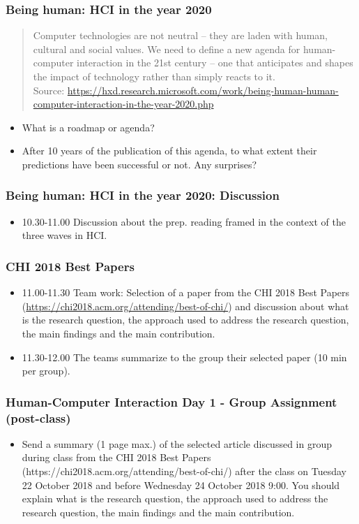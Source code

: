 \documentclass[screen, aspectratio=43]{beamer}
\begin{document}
%
\begin{frame}
\frametitle{Being human: HCI in the year 2020}
\begin{quote}Computer technologies are not neutral – they are laden with human, cultural and social values.  We need to define a new agenda for human-computer interaction in the 21st century – one that anticipates and shapes the impact of technology rather than simply reacts to it. \\
{\scriptsize Source: \url{https://hxd.research.microsoft.com/work/being-human-human-computer-interaction-in-the-year-2020.php} }
\end{quote}
\begin{itemize}
\item What is a roadmap or agenda?
\item After 10 years of the publication of this agenda, to what extent their predictions have been successful or not. Any surprises?
\end{itemize}
\end{frame}
%
\begin{frame}
\frametitle{Being human: HCI in the year 2020: Discussion}
\begin{itemize}
\item 10.30-11.00 Discussion about the prep. reading framed in the context of the three waves in HCI.
\end{itemize}
\end{frame}
%
\begin{frame}
\frametitle{CHI 2018 Best Papers}
\begin{itemize}
\item 11.00-11.30 Team work: Selection of a paper from the CHI 2018 Best Papers (\url{https://chi2018.acm.org/attending/best-of-chi/}) and discussion about what is the research question, the approach used to address the research question, the main findings and the main contribution.
\item 11.30-12.00 The teams summarize to the group their selected paper (10 min per group).
\end{itemize}
\end{frame}
%
\begin{frame}
\frametitle{Human-Computer Interaction Day 1 - Group Assignment (post-class)}
\begin{itemize}
\item Send a summary (1 page max.) of the selected article discussed in group during class from the CHI 2018 Best Papers (https://chi2018.acm.org/attending/best-of-chi/) after the class on Tuesday 22 October 2018 and before Wednesday 24 October 2018 9:00. 
You should explain what is the research question, the approach used to address the research question, the main findings and the main contribution.
\end{itemize}
\end{frame}
\end{document}

